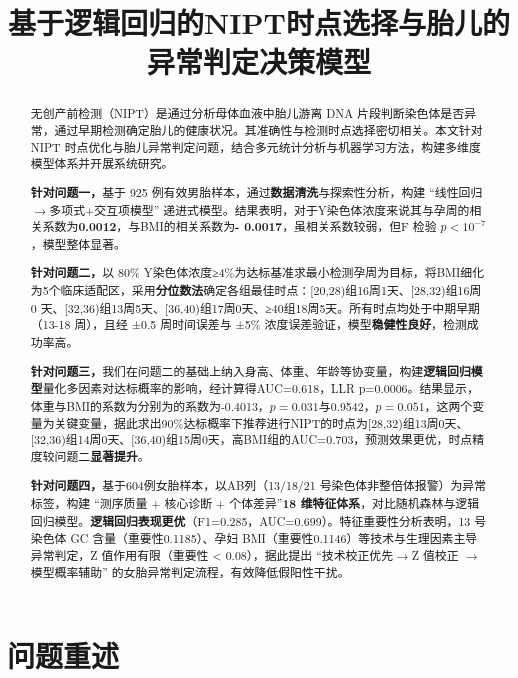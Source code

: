 \documentclass[withoutpreface,bwprint]{cumcmthesis} %
\title{基于逻辑回归的NIPT时点选择与胎儿的异常判定决策模型}
\begin{document}
\maketitle
\nocite{*}


\begin{abstract}
无创产前检测（NIPT）是通过分析母体血液中胎儿游离 DNA 片段判断染色体是否异常，通过早期检测确定胎儿的健康状况。其准确性与检测时点选择密切相关。本文针对 NIPT 时点优化与胎儿异常判定问题，结合多元统计分析与机器学习方法，构建多维度模型体系并开展系统研究。

    \textbf{针对问题一，}基于 925 例有效男胎样本，通过\textbf{数据清洗}与探索性分析，构建 “线性回归$\to$多项式+交互项模型” 递进式模型。结果表明，对于Y染色体浓度来说其与孕周的相关系数为\textbf{0.0012}，与BMI的相关系数为\textbf{- 0.0017}，虽相关系数较弱，但F 检验 $p<10^{-7}$，模型整体显著。

    \textbf{针对问题二，}以 80\% Y染色体浓度≥4\%为达标基准求最小检测孕周为目标，将BMI细化为5个临床适配区，采用\textbf{分位数法}确定各组最佳时点：[20,28)组16周1天、[28,32)组16周0 天、[32,36)组13周5天、[36,40)组17周0天、≥40组18周5天。所有时点均处于中期早期（13-18 周），且经 ±0.5 周时间误差与 ±5\% 浓度误差验证，模型\textbf{稳健性良好}，检测成功率高。

    \textbf{针对问题三，}我们在问题二的基础上纳入身高、体重、年龄等协变量，构建\textbf{逻辑回归模型}量化多因素对达标概率的影响，经计算得AUC=0.618，LLR p=0.0006。结果显示，体重与BMI的系数为分别为的系数为-0.4013，$p=0.031$与0.9542，$p=0.051$，这两个变量为关键变量，据此求出90\%达标概率下推荐进行NIPT的时点为[28,32)组13周0天、[32,36)组14周0天、[36,40)组15周0天，高BMI组的AUC=0.703，预测效果更优，时点精度较问题二\textbf{显著提升}。

    \textbf{针对问题四，}基于604例女胎样本，以AB列（13/18/21 号染色体非整倍体报警）为异常标签，构建 “测序质量 + 核心诊断 + 个体差异”\textbf{18 维特征体系}，对比随机森林与逻辑回归模型。\textbf{逻辑回归表现更优}（F1=0.285，AUC=0.699）。特征重要性分析表明，13 号染色体 GC 含量（重要性0.1185）、孕妇 BMI（重要性0.1146）等技术与生理因素主导异常判定，Z 值作用有限（重要性 < 0.08），据此提出 “技术校正优先$\to$Z 值校正 $\to$ 模型概率辅助” 的女胎异常判定流程，有效降低假阳性干扰。

\end{abstract}


\section{问题重述}
\end{document}
